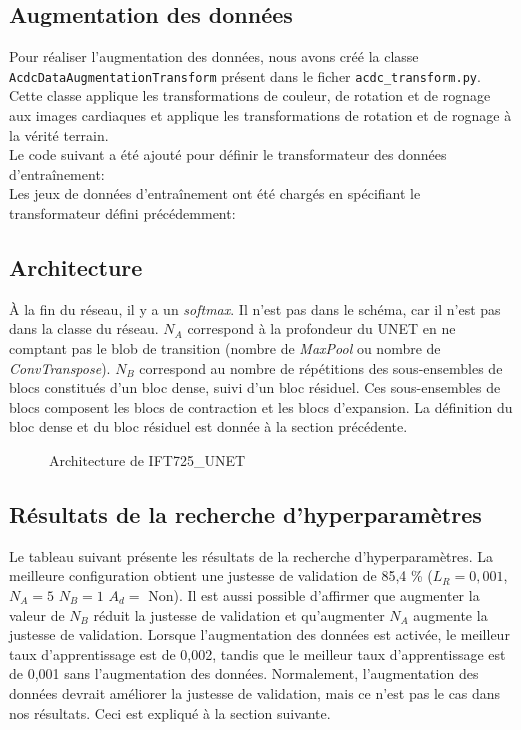 \subsection{Augmentation des données}
    Pour réaliser l'augmentation des données, nous avons créé la classe \texttt{AcdcDataAugmentationTransform} présent dans le ficher \texttt{acdc\_transform.py}. Cette classe applique les transformations de couleur, de rotation et de rognage aux images cardiaques et applique les transformations de rotation et de rognage à la vérité terrain.\\
    
    Le code suivant a été ajouté pour définir le transformateur des données d'entraînement: \\
    
    Les jeux de données d'entraînement ont été chargés en spécifiant le transformateur défini précédemment:    

    \subsection{Architecture}
        À la fin du réseau, il y a un \textit{softmax}. Il n'est pas dans le schéma, car il n'est pas dans la classe du réseau. \(N_A\) correspond à la profondeur du UNET en ne comptant pas le blob de transition (nombre de \textit{MaxPool} ou nombre de \textit{ConvTranspose}). \(N_B\) correspond au nombre de répétitions des sous-ensembles de blocs constitués d'un bloc dense, suivi d'un bloc résiduel. Ces sous-ensembles de blocs composent les blocs de contraction et les blocs d'expansion. La définition du bloc dense et du bloc résiduel est donnée à la section précédente.
        \begin{figure}[H]
            \centering 
            \caption{Architecture de IFT725\_UNET}
        \end{figure}

\subsection{Résultats de la recherche d’hyperparamètres}
    Le tableau suivant présente les résultats de la recherche d'hyperparamètres. La meilleure configuration obtient une justesse de validation de 85,4 \% (\(L_R=0,001\), \(N_A=5\) \(N_B=1\) \(A_d =\) Non). Il est aussi possible d'affirmer que augmenter la valeur de \(N_B\) réduit la justesse de validation et qu'augmenter \(N_A\) augmente la justesse de validation. Lorsque l'augmentation des données est activée, le meilleur taux d'apprentissage est de 0,002, tandis que le meilleur taux d'apprentissage est de 0,001 sans l'augmentation des données. Normalement, l'augmentation des données devrait améliorer la justesse de validation, mais ce n'est pas le cas dans nos résultats. Ceci est expliqué à la section suivante.
    
